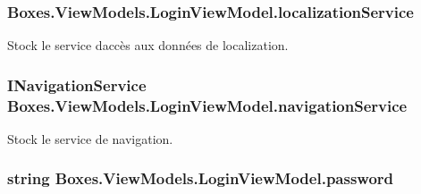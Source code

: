 \subsubsection[{\texorpdfstring{localization\+Service}{localizationService}}]{ Boxes.\+View\+Models.\+Login\+View\+Model.\+localization\+Service\hspace{0.3cm}{\ttfamily [private]}}\hypertarget{class_boxes_1_1_view_models_1_1_login_view_model_a16b58520549ca46282be67efae03e395}{}\label{class_boxes_1_1_view_models_1_1_login_view_model_a16b58520549ca46282be67efae03e395}


Stock le service d\textquotesingle{}accès aux données de localization. 

\subsubsection[{\texorpdfstring{navigation\+Service}{navigationService}}]{\setlength{\rightskip}{0pt plus 5cm}I\+Navigation\+Service Boxes.\+View\+Models.\+Login\+View\+Model.\+navigation\+Service\hspace{0.3cm}{\ttfamily [private]}}\hypertarget{class_boxes_1_1_view_models_1_1_login_view_model_a0381d903ddcdc0df8cd8ade8fb991120}{}\label{class_boxes_1_1_view_models_1_1_login_view_model_a0381d903ddcdc0df8cd8ade8fb991120}


Stock le service de navigation. 

\subsubsection[{\texorpdfstring{password}{password}}]{\setlength{\rightskip}{0pt plus 5cm}string Boxes.\+View\+Models.\+Login\+View\+Model.\+password\hspace{0.3cm}{\ttfamily [private]}}\hypertarget{class_boxes_1_1_view_models_1_1_login_view_model_a70733c161088e84ca1a41bffa75b28dc}{}\label{class_boxes_1_1_view_models_1_1_login_view_model_a70733c161088e84ca1a41bffa75b28dc}


